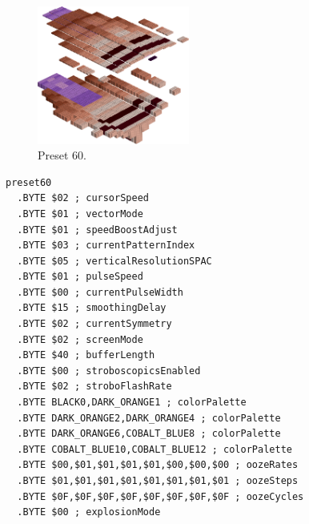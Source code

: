 \clearpage
\begin{minipage}[b]{0.48\linewidth}
\begin{figure}[H]                                                          
  \centering                                                             
  \begin{adjustbox}{width=5cm,center}                                   
  \includegraphics[width=5cm]{src/colorspace_presets/preset60-45.png}%
  \end{adjustbox}                                                        
\caption*{Preset 60.}                                           
\end{figure}                                                               
\end{minipage}
\hspace{0.1cm}
\begin{minipage}[b]{0.48\linewidth}                            
\begin{lstlisting}[basicstyle=\ttfamily\tiny]
preset60
  .BYTE $02 ; cursorSpeed
  .BYTE $01 ; vectorMode
  .BYTE $01 ; speedBoostAdjust
  .BYTE $03 ; currentPatternIndex
  .BYTE $05 ; verticalResolutionSPAC
  .BYTE $01 ; pulseSpeed
  .BYTE $00 ; currentPulseWidth
  .BYTE $15 ; smoothingDelay
  .BYTE $02 ; currentSymmetry
  .BYTE $02 ; screenMode
  .BYTE $40 ; bufferLength
  .BYTE $00 ; stroboscopicsEnabled
  .BYTE $02 ; stroboFlashRate
  .BYTE BLACK0,DARK_ORANGE1 ; colorPalette
  .BYTE DARK_ORANGE2,DARK_ORANGE4 ; colorPalette
  .BYTE DARK_ORANGE6,COBALT_BLUE8 ; colorPalette
  .BYTE COBALT_BLUE10,COBALT_BLUE12 ; colorPalette
  .BYTE $00,$01,$01,$01,$01,$00,$00,$00 ; oozeRates
  .BYTE $01,$01,$01,$01,$01,$01,$01,$01 ; oozeSteps
  .BYTE $0F,$0F,$0F,$0F,$0F,$0F,$0F,$0F ; oozeCycles
  .BYTE $00 ; explosionMode
\end{lstlisting}
\end{minipage}

\vspace*{0.3cm}

